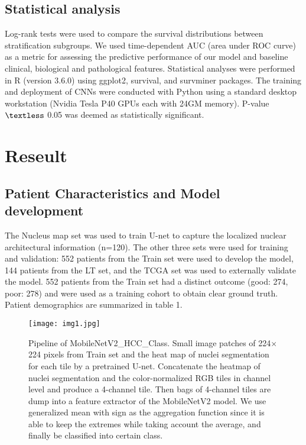 \documentclass{article}
\begin{document}
\subsection{Statistical analysis}
Log-rank tests were used to compare the survival distributions between stratification subgroups. We used time-dependent AUC (area under ROC curve) as a metric for assessing the predictive performance of our model and baseline clinical, biological and pathological features. Statistical analyses were performed in R (version 3.6.0) using ggplot2, survival, and survminer packages. The training and deployment of CNNs were conducted with Python using a standard desktop workstation (Nvidia Tesla P40 GPUs each with 24GM memory). P-value $\textless$ 0.05 was deemed as statistically significant. 




\section{Reseult}
\label{sec:others}

\subsection{Patient Characteristics and Model development}
The Nucleus map set was used to train U-net to capture the localized nuclear architectural information (n=120). The other three sets were used for training and validation: 552 patients from the Train set were used to develop the model, 144 patients from the LT set, and the TCGA set was used to externally validate the model. 552 patients from the Train set had a distinct outcome (good: 274, poor: 278) and were used as a training cohort to obtain clear ground truth. Patient demographics are summarized in table 1.

\begin{figure*}[h]
	\centerline{\texttt{[image: img1.jpg]}}
	\caption{Pipeline of MobileNetV2\_HCC\_Class. Small image patches of 224$\times$224 pixels from Train set and the heat map of nuclei segmentation for each tile by a pretrained U-net. Concatenate the heatmap of nuclei segmentation and the color-normalized RGB tiles in channel level and produce a 4-channel tile. Then bags of 4-channel tiles are dump into a feature extractor of the MobileNetV2 model. We use generalized mean with sign as the aggregation function since it is able to keep the extremes while taking account the average, and finally be classified into certain class.
	}
	\label{pip}
\end{figure*}
\end{document}
